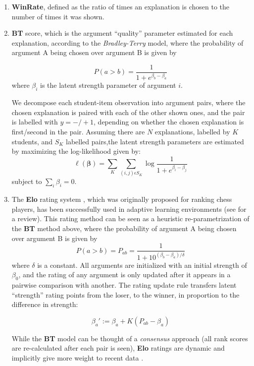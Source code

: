 \documentclass[notitlepage,12pt]{jedm}
\begin{document}
\begin{enumerate}
	
	\item \textbf{WinRate}, defined as the ratio of times an explanation is 
	chosen to the number of times it was shown.
	
	\item \textbf{BT} score, which is the argument ``quality'' parameter 
	estimated for each explanation, according to the \textit{Bradley-Terry} 
	model, where the probability of argument A being chosen over argument B is 
	given by 
	
	$$
	P(a>b) = 
	\frac{1}{1+e^{\beta_b-\beta_a}}
	$$
	where $\beta_i$ is the latent strength parameter of argument $i$. 
	
	We decompose each student-item observation into argument pairs, where the 
	chosen explanation is paired with each of the other shown ones, and the 
	pair is labelled with $y=-/+1$, depending on whether the chosen explanation 
	is first/second in the pair.
	Assuming there are $N$ explanations, labelled by $K$ students, and $S_K$ 
	labelled pairs,the latent strength parameters are estimated by maximizing 
	the log-likelihood given by:
	$$
	\ell(\boldsymbol{\beta})=\sum_{K}\sum_{(i,j)\epsilon S_K}^{} 
	\log\frac{1}{1+e^{\beta_i - \beta_j}}
	$$
	subject to $\sum_{i}\beta_i=0$.
	
	
	\item The \textbf{Elo} rating system \cite{elo_rating_1978}, which was 
	originally proposed for ranking chess players, has been successfully used 
	in adaptive learning environments (see \cite{pelanek_applications_2016} for 
	a review). 
	This rating method can be seen as a heuristic re-parametrization of the 
	\textbf{BT} method above, where the probability of argument A being chosen 
	over argument B is given by
	$$
	P(a>b) = P_{ab} = \frac{1}{1+10^{(\beta_b-\beta_a)/\delta}}
	$$
	where $\delta$ is a constant. 
	All arguments are initialized with an initial strength of $\beta_0$, and 
	the rating of any argument is only updated after it appears in a pairwise 
	comparison with another.
	The rating update rule transfers latent ``strength'' rating points from the 
	loser, to the 
	winner, in proportion to the difference in strength:
	
	$$
	\beta_a':=\beta_a+K(P_{ab} - \beta_a)
	$$
	
	While the \textbf{BT} model can be thought of a \textit{consensus} 
	approach (all rank scores are re-calculated after each pair is seen), 
	\textbf{Elo} ratings are dynamic and implicitly give more weight 
	to recent data \cite{aldous_elo_2017}.
	

\end{enumerate}
\end{document}
